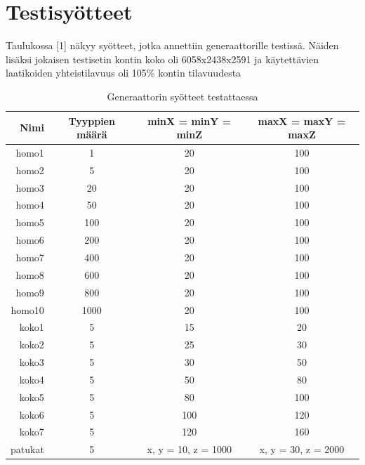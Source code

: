 \documentclass[a4paper,12pt, titlepage]{article}
\begin{document}
\section*{Testisyötteet}

Taulukossa [1] näkyy syötteet, jotka annettiin generaattorille testissä. Näiden lisäksi jokaisen testisetin kontin koko oli 6058x2438x2591 ja käytettävien laatikoiden yhteistilavuus oli 105\% kontin tilavuudesta
\begin{table}[H]
\begin{tabular}{r|c|c|c}
\textbf{Nimi}                      & \textbf{Tyyppien määrä} & \textbf{minX = minY = minZ} & \textbf{maxX = maxY = maxZ} \\
\hline
homo1                     & 1              & 20                 & 100                \\
homo2                     & 5              & 20                 & 100                \\
homo3                     & 20             & 20                 & 100                \\
homo4                     & 50             & 20                 & 100                \\
homo5                     & 100            & 20                 & 100                \\
homo6                     & 200            & 20                 & 100                \\
homo7                     & 400            & 20                 & 100                \\
homo8                     & 600            & 20                 & 100                \\
homo9                     & 800            & 20                 & 100                \\
homo10                    & 1000           & 20                 & 100                \\
\hline
koko1                     & 5              & 15                 & 20                 \\
koko2                     & 5              & 25                 & 30                 \\
koko3                     & 5              & 30                 & 50                 \\
koko4                     & 5              & 50                 & 80                 \\
koko5                     & 5              & 80                 & 100                \\
koko6                     & 5              & 100                & 120                \\
koko7                     & 5              & 120                & 160                \\
\hline
patukat                   & 5              & x, y = 10, z = 1000 & x, y = 30, z = 2000              
\end{tabular}
\caption{Generaattorin syötteet testattaessa}
\end{table}
\end{document}
